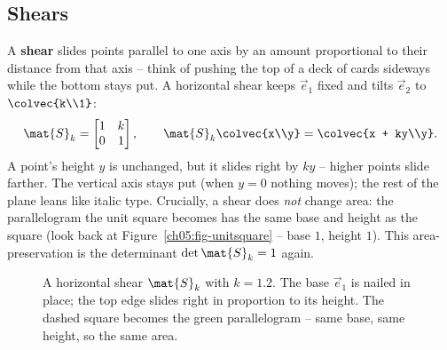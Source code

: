 \subsection{Shears}
\label{ch05:shears}

A \textbf{shear} slides points parallel to one axis by an amount proportional to
their distance from that axis -- think of pushing the top of a deck of cards
sideways while the bottom stays put. A horizontal shear keeps $\vec{e}_1$ fixed
and tilts $\vec{e}_2$ to $\colvec{k\\1}$:
\[
  \mat{S}_k = \begin{bmatrix} 1 & k \\ 0 & 1 \end{bmatrix},
  \qquad
  \mat{S}_k\colvec{x\\y} = \colvec{x + ky\\y}.
\]
A point's height $y$ is unchanged, but it slides right by $ky$ -- higher points
slide farther. The vertical axis stays put (when $y = 0$ nothing moves); the rest
of the plane leans like italic type. Crucially, a shear does \emph{not} change
area: the parallelogram the unit square becomes has the same base and height as
the square (look back at Figure~\ref{ch05:fig-unitsquare} -- base $1$, height
$1$). This area-preservation is the determinant $\det \mat{S}_k = 1$ again.

\begin{figure}[H]
\centering
{}
\caption{A horizontal shear $\mat{S}_k$ with $k=1.2$. The base $\vec{e}_1$ is
nailed in place; the top edge slides right in proportion to its height. The dashed
square becomes the green parallelogram -- same base, same height, so the same
area.}
\label{ch05:fig-shear}
\end{figure}

